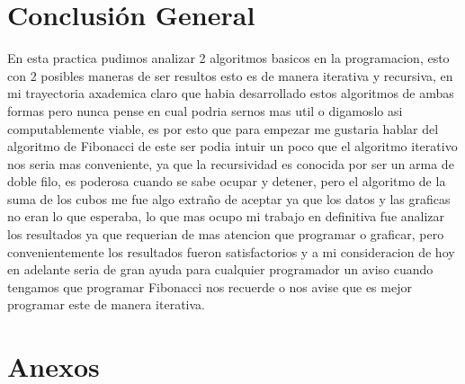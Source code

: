 \documentclass[spanish]{article}
\begin{document}
	{	\newpage
	\section{Conclusi\'on General}
	En esta practica pudimos analizar 2 algoritmos basicos en la programacion, esto con 2 posibles maneras de ser resultos esto es de manera iterativa y recursiva, en mi trayectoria axademica claro que habia desarrollado estos algoritmos de ambas formas
pero nunca pense en cual podria sernos mas util o digamoslo asi computablemente viable, es por esto que para empezar me gustaria hablar del algoritmo de Fibonacci de este ser podia intuir un poco que el algoritmo iterativo nos seria mas
conveniente, ya que la recursividad es conocida por ser un arma de doble filo, es poderosa cuando se sabe ocupar y detener, pero el algoritmo de la suma de los cubos me fue algo extraño de aceptar ya que los datos y las graficas no eran lo que esperaba,
lo que mas ocupo mi trabajo en definitiva fue analizar los resultados ya que requerian de mas atencion que programar o graficar, pero convenientemente los resultados fueron satisfactorios y a mi consideracion de hoy en adelante seria de
gran ayuda para cualquier programador un aviso cuando tengamos que programar Fibonacci nos recuerde o nos avise que es mejor programar este de manera iterativa.
	\newpage
	\section{Anexos}
	
}
\end{document}
